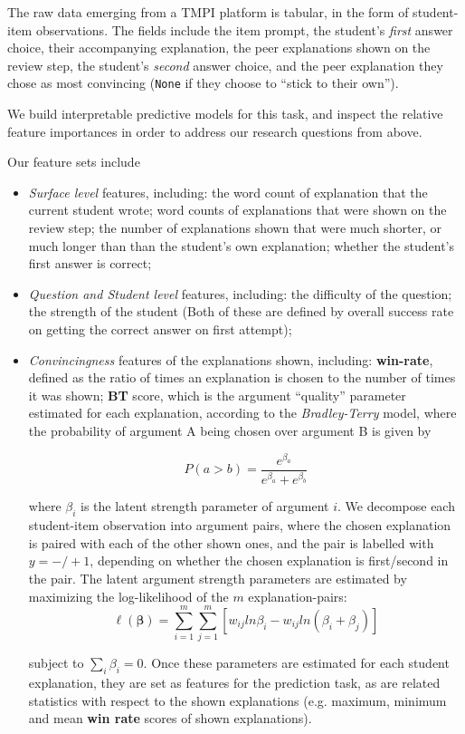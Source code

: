 \documentclass[sigconf]{acmart}
\begin{document}
The raw data emerging from a TMPI platform is tabular, in the form of 
student-item observations.
The fields include the item prompt, the student's \textit{first} answer choice, 
their accompanying explanation, the peer explanations shown on the review step, 
the student's \textit{second} answer choice, and the peer explanation they 
chose as most convincing (\verb|None| if they choose to ``stick to their own'').

We build interpretable predictive models for this task, and inspect the 
relative feature importances in order to address our research questions from 
above.

Our feature sets include
\begin{itemize}
	\item \textit{Surface level} features, including: 
	the word count of explanation that the current student wrote; 
	word counts of explanations that were shown on the review step; 
	the number of explanations shown that were much shorter, or much longer 
	than than the student's own explanation; 
	whether the student's first answer is correct;

	\item \textit{Question and Student level} features, including: 
	the difficulty of the question; 
	the strength of the student
	(Both of these are defined by overall success rate on getting the correct 
	answer on first attempt);
	
	\item \textit{Convincingness} features of the explanations shown, 
	including: 
	\textbf{win-rate}, defined as the ratio of times an explanation is chosen 
	to the number of times it was shown; 
	\textbf{BT} score, which is the argument ``quality'' parameter 
	estimated for each explanation, according to the \textit{Bradley-Terry} 
	model, where the probability of argument A being chosen over argument B is 
	given by 

$$
P(a>b) = 
\frac{e^{\beta_a}}{e^{\beta_a}+e^{\beta_b}}
$$

where $\beta_i$ is the latent strength parameter of argument $i$. 
We decompose each student-item observation into argument pairs, where the 
chosen explanation is paired with each of the other shown ones, and the pair is 
labelled with $y=-/+1$, depending on whether the chosen explanation is 
first/second in the pair.   
The latent argument strength parameters are estimated by maximizing the 
log-likelihood of the $m$ explanation-pairs:
$$
\ell(\boldsymbol{\beta})=\sum_{i=1}^{m}\sum_{j=1}^{m} 
[w_{ij}ln\beta_i-w_{ij}ln(\beta_i+\beta_j)]
$$

subject to $\sum_{i}\beta_i=0$.
Once these parameters are estimated for each student explanation, they are set 
as features for the prediction task, as are related statistics with respect to 
the shown explanations (e.g. maximum, minimum and mean \textbf{win rate} scores 
of shown 
explanations).
\end{itemize}
\end{document}
